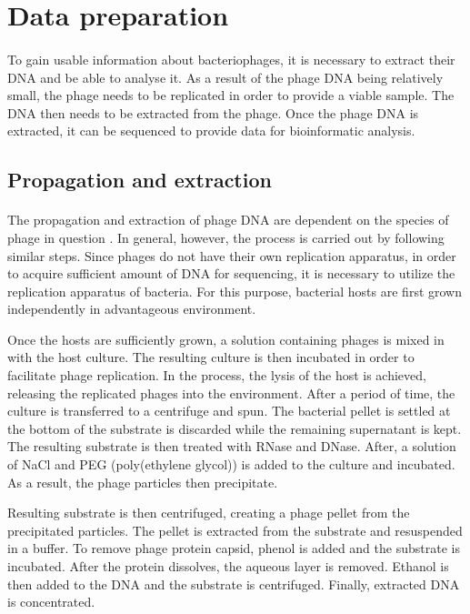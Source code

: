 \section{Data preparation}
\paragraph*{}
To gain usable information about bacteriophages, it is necessary to extract their DNA and be able to analyse it. As a result of the phage DNA being relatively small, the phage needs to be replicated in order to provide a viable sample. The DNA then needs to be extracted from the phage. Once the phage DNA is extracted, it can be sequenced to provide data for bioinformatic analysis. 

\subsection{Propagation and extraction}
\paragraph*{}
The propagation and extraction of phage DNA are dependent on the species of phage in question \cite{kleiner2015evaluation}. In general, however, the process is carried out by following similar steps. Since phages do not have their own replication apparatus, in order to acquire sufficient amount of DNA for sequencing, it is necessary to utilize the replication apparatus of bacteria. For this purpose, bacterial hosts are first grown independently in advantageous environment.

Once the hosts are sufficiently grown, a solution containing phages is mixed in with the host culture. The resulting culture is then incubated in order to facilitate phage replication. In the process, the lysis of the host is achieved, releasing the replicated phages into the environment. After a period of time, the culture is transferred to a centrifuge and spun. The bacterial pellet is settled at the bottom of the substrate is discarded while the remaining supernatant is kept. The resulting substrate is then treated with RNase and DNase. After, a solution of NaCl and PEG (poly(ethylene glycol)) is added to the culture and incubated. As a result, the phage particles then precipitate. 

Resulting substrate is then centrifuged, creating a phage pellet from the precipitated particles. The pellet is extracted from the substrate and resuspended in a buffer. To remove phage protein capsid, phenol is added and the substrate is incubated. After the protein dissolves, the aqueous layer is removed. Ethanol is then added to the DNA and the substrate is centrifuged. Finally, extracted DNA is concentrated.

